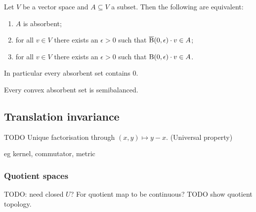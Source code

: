\begin{lemma}
Let $V$ be a vector space and $A\subseteq V$ a subset. Then the following are equivalent:
\begin{enumerate}
\item $A$ is absorbent;
\item for all $v\in V$ there exists an $\epsilon>0$ such that $\operatorname{\overline{B}}(0,\epsilon)\cdot v\in A$;
\item for all $v\in V$ there exists an $\epsilon>0$ such that $\operatorname{B}(0,\epsilon)\cdot v\in A$.
\end{enumerate}
In particular every absorbent set contains $0$.
\end{lemma}
\begin{corollary} \label{convexAbsorbentImpliesSemibalanced}
Every convex absorbent set is semibalanced.
\end{corollary}

\subsection{Translation invariance}
TODO Unique factorisation through $(x,y)\mapsto y-x$. (Universal property)

eg kernel, commutator, metric

\subsubsection{Quotient spaces}
TODO: need closed $U$? For quotient map to be continuous? TODO show quotient topology.

